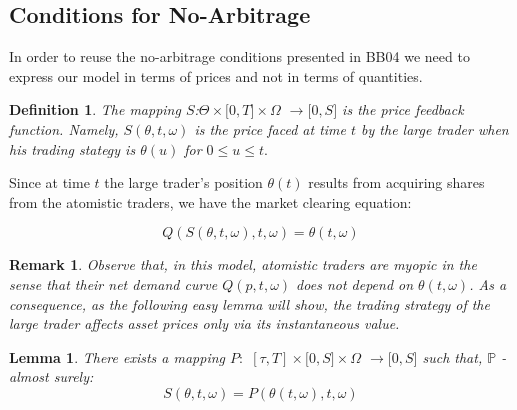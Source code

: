 \documentclass{article}
\newtheorem{lemma}[theorem]{Lemma}
\newtheorem{definition}{Definition}
\newtheorem{remark}{Remark}
\begin{document}
\bigskip

\subsection{Conditions for No-Arbitrage}

In order to reuse the no-arbitrage conditions presented in BB04 we need to
express our model in terms of prices and not in terms of quantities.

\bigskip


\begin{definition}
The mapping $S$:$\Theta \times \lbrack 0,T]\times \Omega $ $\rightarrow
\lbrack 0,S]$ is the price feedback function. Namely, $S(\theta ,t,\omega )$
is the price faced at time $t$ by the large trader when his trading stategy
is $\theta (u)$ for $0\leq u\leq t.$
\end{definition}


Since at time $t$ the large trader's position $\theta (t)$ results from
acquiring shares from the atomistic traders, we have the market clearing
equation:

\begin{equation}
Q(S(\theta ,t,\omega ),t,\omega )=\theta (t,\omega )  \label{market_clearing}
\end{equation}


\begin{remark}
Observe that, in this model, atomistic traders are myopic in the sense that
their net demand curve $Q(p,t,\omega )$ does not depend on $\theta (t,\omega
)$. As a consequence, as the following easy lemma will show, the trading
strategy of the large trader affects asset prices only via its instantaneous
value.
\end{remark}



\begin{lemma}
\label{lemma::mapping} There exists a mapping $P:$ $[\tau ,T]\times \lbrack
0,S]\times \Omega $ $\rightarrow \lbrack 0,S]$ such that, $\mathbb{P}$%
-almost surely:%
\begin{equation}
S(\theta ,t,\omega )=P(\theta (t,\omega ),t,\omega )  \label{def_of_P}
\end{equation}
\end{lemma}
\end{document}
